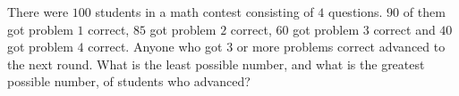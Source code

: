 There were $100$ students in a math contest consisting of $4$ questions. $90$ of them got problem $1$ correct, $85$ got problem $2$ correct, $60$ got problem $3$ correct and $40$ got problem $4$ correct. Anyone who got $3$ or more problems correct advanced to the next round. What is the least possible number, and what is the greatest possible number, of students who advanced?
